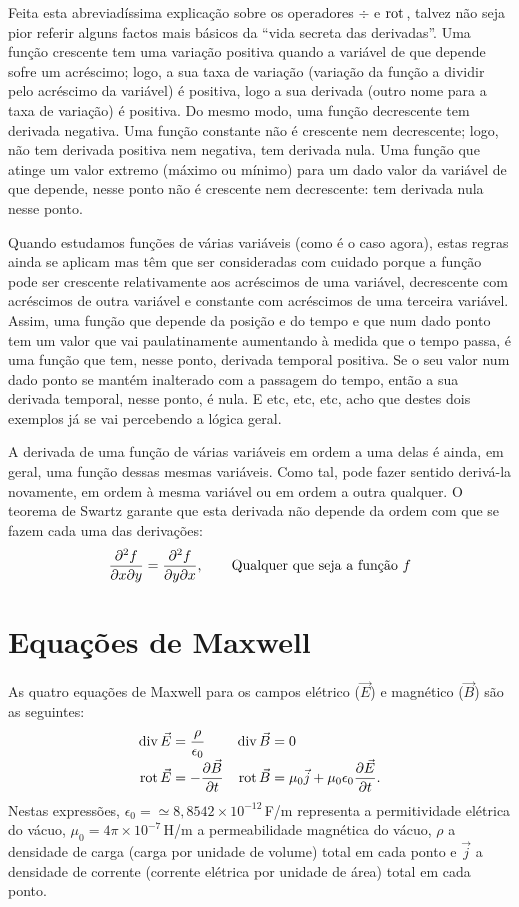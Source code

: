 {\small%
  Feita esta abreviadíssima explicação sobre os operadores $\div$ e $\text{rot}\,$,
  talvez não seja pior referir alguns factos mais básicos da ``vida secreta
  das derivadas''. Uma função crescente tem uma variação positiva quando a
  variável de que depende sofre um acréscimo; logo, a sua taxa de variação
  (variação da função a dividir pelo acréscimo da variável) é positiva, logo a
  sua derivada (outro nome para a taxa de variação) é positiva. Do mesmo modo,
  uma função decrescente tem derivada negativa. Uma função constante não é
  crescente nem decrescente; logo, não tem derivada positiva nem negativa, tem
  derivada nula.  Uma função que atinge um valor extremo (máximo ou mínimo) para
  um dado valor da variável de que depende, nesse ponto não é crescente nem
  decrescente: tem derivada nula nesse ponto.

  Quando estudamos funções de várias variáveis (como é o caso agora), estas
  regras ainda se aplicam mas têm que ser consideradas com cuidado porque a
  função pode ser crescente relativamente aos acréscimos de uma variável,
  decrescente com acréscimos de outra variável e constante com acréscimos de uma
  terceira variável. Assim, uma função que depende da posição e do tempo e que
  num dado ponto tem um valor que vai paulatinamente aumentando à medida que o
  tempo passa, é uma função que tem, nesse ponto, derivada temporal positiva. Se
  o seu valor num dado ponto se mantém inalterado com a passagem do tempo, então
  a sua derivada temporal, nesse ponto, é nula. E etc, etc, etc, acho que destes
  dois exemplos já se vai percebendo a lógica geral.

  A derivada de uma função de várias variáveis em ordem a uma delas é ainda, em
  geral, uma função dessas mesmas variáveis. Como tal, pode fazer sentido
  derivá-la novamente, em ordem à mesma variável ou em ordem a outra qualquer. O
  teorema de Swartz garante que esta derivada não depende da ordem com que se
  fazem cada uma das derivações:
  \begin{equation*}
    \frac{\partial^2 f}{\partial x\partial y}=
    \frac{\partial^2 f}{\partial y\partial x},\qquad\text{Qualquer que seja a função $f$}
  \end{equation*}
}

\section{Equações de Maxwell}
As quatro equações de Maxwell para os campos elétrico ($\vec E$) e magnético
($\vec B$) são as seguintes:
\begin{align*}
  \div\vec E&=\frac{\rho}{\epsilon_0}&\div\vec B&=0\\
  \rot\vec E&=-\pd{\vec B}{t}&
  \rot\vec B&=\mu_0\vec j+\mu_0\epsilon_0\pd{\vec E}{t}.
\end{align*}
Nestas expressões, $\epsilon_0=\simeq8,8542\times10^{-12}$\,F/m representa a
permitividade elétrica do vácuo, $\mu_0=4\pi\times10^{-7}$\,H/m a permeabilidade
magnética do vácuo, $\rho$ a densidade de carga (carga por unidade de volume)
total em cada ponto e $\vec j$ a densidade de corrente (corrente elétrica por
unidade de área) total em cada ponto.

